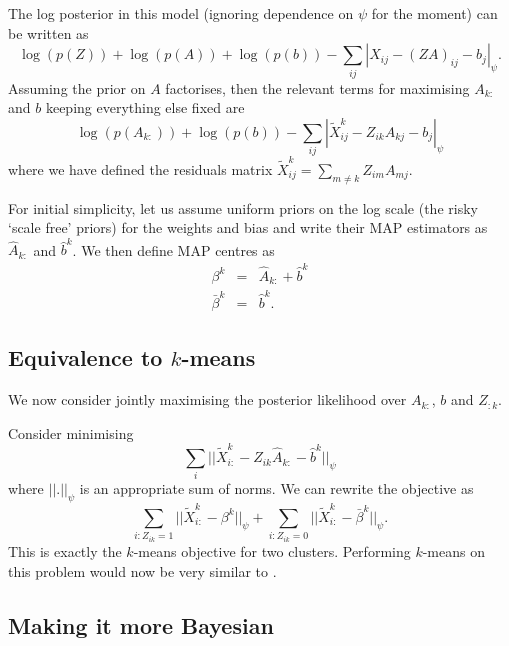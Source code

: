 \documentclass{article}
\numberwithin{equation}{section}
\numberwithin{thm}{section}
\def\IBP{Z}
\def\Weights{A}
\def\Data{X}
\def\Residuals{\tilde{X}}
\def\bias{b}
\def\centre{\beta}
\begin{document}
The log posterior in this model (ignoring dependence on $\psi$ for the moment) can be written as
\begin{equation}
\log(p(\IBP)) + \log(p(\Weights)) + \log(p(\bias)) - \sum_{ij}|\Data_{ij} - (\IBP\Weights)_{ij} - \bias_j|_\psi.
\end{equation}
Assuming the prior on $\Weights$ factorises, then the relevant terms for maximising $\Weights_{k:}$ and $\bias$ keeping everything else fixed are
\begin{equation}
\log(p(\Weights_{k:})) + \log(p(\bias)) - \sum_{ij} |\Residuals^k_{ij} - \IBP_{ik}\Weights_{kj} - \bias_j|_\psi
\end{equation}
where we have defined the residuals matrix $\Residuals^k_{ij} = \sum_{m \neq k}\IBP_{im}\Weights_{mj}$.

For initial simplicity, let us assume uniform priors on the log scale (\ie the risky `scale free' priors) for the weights and bias and write their MAP estimators as $\hat{\Weights}_{k:}$ and $\hat{\bias}^k$. We then define MAP centres as
\begin{eqnarray}
\centre^k & = & \hat{\Weights}_{k:} + \hat{\bias}^k \\
\bar{\centre}^k & = & \hat{\bias}^k.
\end{eqnarray}

\subsection{Equivalence to $k$-means}

We now consider jointly maximising the posterior likelihood over $\Weights_{k:}$, $\bias$ and $\IBP_{:k}$.

Consider minimising
\begin{equation}
\sum_i||\Residuals^k_{i:} - \IBP_{ik}\hat{\Weights}_{k:} - \hat{\bias}^k||_\psi
\end{equation}
where $||.||_\psi$ is an appropriate sum of norms. We can rewrite the objective as
\begin{equation}
\sum_{i: \IBP_{ik} = 1}||\Residuals^k_{i:} - \centre^k||_\psi + \sum_{i: \IBP_{ik} = 0}||\Residuals^k_{i:} - \bar{\centre}^k||_\psi.
\end{equation}
This is exactly the $k$-means objective for two clusters.
Performing $k$-means on this problem would now be very similar to \cite{Cui2007}.

\subsection{Making it more Bayesian}
\end{document}
